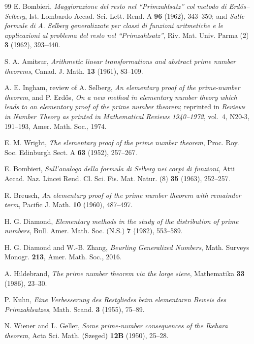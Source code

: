 \documentclass[11pt,letterpaper]{article}
\numberwithin{equation}{section}
\theoremstyle{definition}
\theoremstyle{remark}
\begin{document}
\begin{thebibliography}{99}
E. Bombieri,
\emph{Maggiorazione del resto nel ``Primzahlsatz'' col metodo di
Erd\H{o}s--Selberg}, Ist. Lombardo Accad. Sci. Lett. Rend. A \textbf{96}
(1962), 343--350; and \emph{Sulle formule di A. Selberg generalizzate per
classi di funzioni aritmetiche e le applicazioni al problema del resto nel
``Primzahlsatz''}, Riv. Mat. Univ. Parma (2) \textbf{3} (1962), 393--440.

S. A. Amitsur,
\emph{Arithmetic linear transformations and abstract prime number theorems},
Canad. J. Math. \textbf{13} (1961), 83--109.

A. E. Ingham,
review of A. Selberg, \emph{An elementary proof of the prime-number
theorem}, and P. Erd\H{o}s, \emph{On a new method in elementary number
theory which leads to an elementary proof of the prime number theorem};
reprinted in \emph{Reviews in Number Theory as printed in Mathematical
Reviews 1940--1972}, vol.~4, N20-3, 191--193, Amer. Math. Soc., 1974.

E. M. Wright,
\emph{The elementary proof of the prime number theorem},
Proc. Roy. Soc. Edinburgh Sect. A \textbf{63} (1952), 257--267.

E. Bombieri,
\emph{Sull'analogo della formula di Selberg nei corpi di funzioni},
Atti Accad. Naz. Lincei Rend. Cl. Sci. Fis. Mat. Natur. (8) \textbf{35}
(1963), 252--257.

R. Breusch,
\emph{An elementary proof of the prime number theorem with remainder term},
Pacific J. Math. \textbf{10} (1960), 487--497.

H. G. Diamond,
\emph{Elementary methods in the study of the distribution of prime numbers},
Bull. Amer. Math. Soc. (N.S.) \textbf{7} (1982), 553--589.

H. G. Diamond and W.-B. Zhang,
\emph{Beurling Generalized Numbers},
Math. Surveys Monogr. \textbf{213}, Amer. Math. Soc., 2016.

A. Hildebrand,
\emph{The prime number theorem via the large sieve},
Mathematika \textbf{33} (1986), 23--30.

P. Kuhn,
\emph{Eine Verbesserung des Restgliedes beim elementaren Beweis des
Primzahlsatzes}, Math. Scand. \textbf{3} (1955), 75--89.

N. Wiener and L. Geller,
\emph{Some prime-number consequences of the Ikehara theorem},
Acta Sci. Math. (Szeged) \textbf{12B} (1950), 25--28.


\end{thebibliography}
\end{document}
